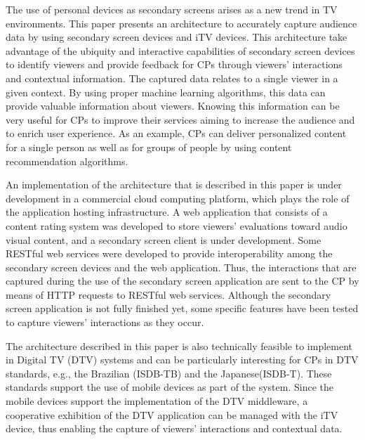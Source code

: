 \documentclass[journal]{IEEEtran}
\begin{document}
The use of personal devices as secondary screens arises as a new trend in TV environments. This paper presents an architecture to accurately capture audience data by using secondary screen devices and iTV devices. This architecture take advantage of the ubiquity and interactive capabilities of secondary screen devices to identify viewers and provide feedback for CPs through viewers' interactions and contextual information. The captured data relates to a single viewer in a given context. By using proper machine learning algorithms, this data can provide valuable information about viewers. Knowing this information can be very useful for CPs to improve their services aiming to increase the audience and to enrich user experience. As an example, CPs can deliver personalized content for a single person as well as for groups of people by using content recommendation algorithms.

An implementation of the architecture that is described in this paper is under development in a commercial cloud computing platform, which plays the role of the application hosting infrastructure. A web application that consists of a content rating system was developed to store  viewers' evaluations toward audio visual content, and a secondary screen client is under development. Some RESTful web services were developed to provide interoperability among the secondary screen devices and the web application. Thus, the interactions that are captured during the use of the secondary screen application are sent to the CP by means of HTTP requests to RESTful web services. Although the secondary screen application is not fully finished yet, some specific features have been tested to capture viewers' interactions as they occur.

The architecture described in this paper is also technically feasible to implement in Digital TV (DTV) systems and can be particularly interesting for CPs in DTV standards, e.g., the Brazilian (ISDB-TB) and the Japanese(ISDB-T). These standards support the use of mobile devices as part of the system. Since the mobile devices support the implementation of the DTV middleware, a cooperative exhibition of the DTV application can be managed with the iTV device, thus enabling the capture of viewers' interactions and contextual data.



\end{document}
